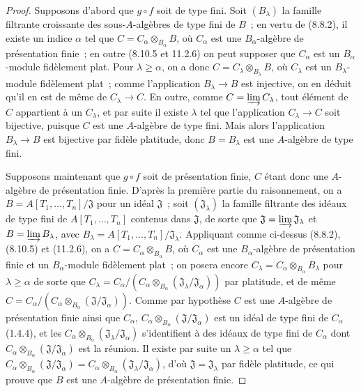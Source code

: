 \begin{proof}
Supposons d'abord que $g\circ f$ soit de type fini. Soit $(B_\lambda)$ la
famille filtrante croissante des sous-$A$-algèbres de type fini de $B$~; en
vertu de (8.8.2), il existe un indice $\alpha$ tel que
$C=C_\alpha\otimes_{B_\alpha}B$, où $C_\alpha$ est une
$B_\alpha$-algèbre de présentation finie~; en outre (8.10.5 et 11.2.6) on peut
supposer que $C_\alpha$ est un $B_\alpha$-module fidèlement plat. Pour
$\lambda\geq\alpha$, on a donc
$C=C_\lambda\otimes_{B_\lambda}B$, où $C_\lambda$ est un
$B_\lambda$-module fidèlement plat~; comme l'application $B_\lambda\to B$ est
injective, on en déduit qu'il en est de même de $C_\lambda\to C$. En outre,
comme $C=\varinjlim C_\lambda$, tout élément de $C$ appartient à un
$C_\lambda$, et par suite il existe $\lambda$ tel que l'application
$C_\lambda\to C$
soit bijective, puisque $C$ est une $A$-algèbre de type fini. Mais alors
l'application $B_\lambda\to B$ est bijective par fidèle platitude, donc
$B=B_\lambda$ est une $A$-algèbre de type fini.

Supposons maintenant que $g\circ f$ soit de présentation finie, $C$ étant donc
une $A$-algèbre de présentation finie. D'après la première partie du
raisonnement, on a
$B=A[T_1,\ldots,T_n]/\mathfrak J$
pour un idéal $\mathfrak J$~; soit
$(\mathfrak J_\lambda)$ la famille filtrante des idéaux de type
fini de $A[T_1,\ldots,T_n]$ contenus dans $\mathfrak J$, de sorte
que $\mathfrak J=\varinjlim\mathfrak J_\lambda$ et
$B=\varinjlim B_\lambda$, avec
$B_\lambda=A[T_1,\ldots,T_n]/\mathfrak J_\lambda$. Appliquant
comme ci-dessus (8.8.2), (8.10.5) et (11.2.6), on a
$C=C_\alpha\otimes_{B_\alpha}B$, où $C_\alpha$ est une
$B_\alpha$-algèbre de présentation finie et un $B_\alpha$-module fidèlement
plat~; on posera encore $C_\lambda=C_\alpha\otimes_{B_\alpha}B_\lambda$ pour
$\lambda\geq\alpha$ de sorte que
$C_\lambda=C_\alpha/(C_\alpha\otimes_{B_\alpha}
(\mathfrak J_\lambda/\mathfrak J_\alpha))$
par platitude, et de même
$C=C_\alpha/(C_\alpha\otimes_{B_\alpha}
(\mathfrak J/\mathfrak J_\alpha))$.
Comme par hypothèse $C$ est une $A$-algèbre de présentation finie ainsi que
$C_\alpha$, $C_\alpha\otimes_{B_\alpha}
(\mathfrak J/\mathfrak J_\alpha)$ est un idéal de
type fini de $C_\alpha$ (1.4.4), et les
$C_\alpha\otimes_{B_\alpha}
(\mathfrak J_\lambda/\mathfrak J_\alpha)$
s'identifient à des idéaux de type fini de $C_\alpha$ dont
$C_\alpha\otimes_{B_\alpha}
(\mathfrak J/\mathfrak J_\alpha)$ est la réunion. Il
existe par suite un $\lambda\geq\alpha$ tel que
$C_\alpha\otimes_{B_\alpha}
(\mathfrak J/\mathfrak J_\alpha)
=C_\alpha\otimes_{B_\alpha}
(\mathfrak J_\lambda/\mathfrak J_\alpha)$,
d'où $\mathfrak J=\mathfrak J_\lambda$ par fidèle
platitude, ce qui prouve que $B$ est une $A$-algèbre de présentation finie.
\end{proof}

